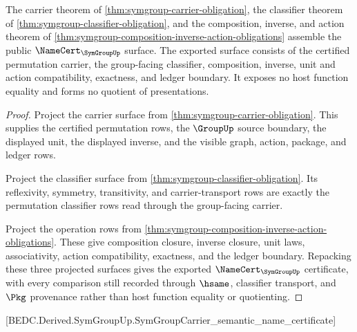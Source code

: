\begin{theorem}
\label{thm:symgroup-public-certificate-surface}
The carrier theorem of \autoref{thm:symgroup-carrier-obligation}, the classifier
theorem of \autoref{thm:symgroup-classifier-obligation}, and the composition,
inverse, and action theorem of
\autoref{thm:symgroup-composition-inverse-action-obligations} assemble the
public $\NameCert_{\SymGroupUp}$ surface. The exported surface consists of the
certified permutation carrier, the group-facing classifier, composition, inverse,
unit and action compatibility, exactness, and ledger boundary. It exposes no
host function equality and forms no quotient of presentations.
\end{theorem}
\begin{proof}
Project the carrier surface from
\autoref{thm:symgroup-carrier-obligation}. This supplies the certified
permutation rows, the $\GroupUp$ source boundary, the displayed unit, the
displayed inverse, and the visible graph, action, package, and ledger rows.

Project the classifier surface from
\autoref{thm:symgroup-classifier-obligation}. Its reflexivity, symmetry,
transitivity, and carrier-transport rows are exactly the permutation classifier
rows read through the group-facing carrier.

Project the operation rows from
\autoref{thm:symgroup-composition-inverse-action-obligations}. These give
composition closure, inverse closure, unit laws, associativity, action
compatibility, exactness, and the ledger boundary. Repacking these three
projected surfaces gives the exported $\NameCert_{\SymGroupUp}$ certificate,
with every comparison still recorded through $\hsame$, classifier transport, and
$\Pkg$ provenance rather than host function equality or quotienting.
\end{proof}

[BEDC.Derived.SymGroupUp.SymGroupCarrier\_semantic\_name\_certificate]

